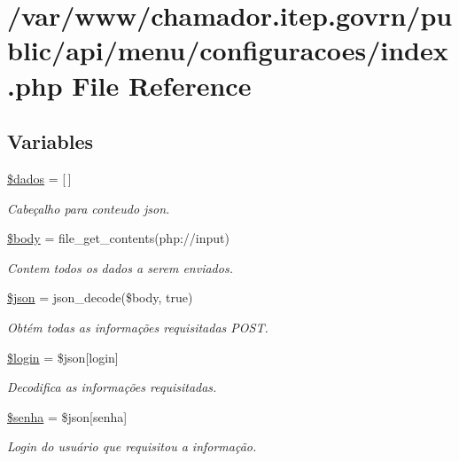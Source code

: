 \hypertarget{menu_2configuracoes_2index_8php}{}\section{/var/www/chamador.itep.\+govrn/public/api/menu/configuracoes/index.php File Reference}
\label{menu_2configuracoes_2index_8php}
\subsection*{Variables}
\begin{DoxyCompactItemize}
\item 
\hyperlink{menu_2configuracoes_2index_8php_a252370d95039a38fa11afab784725d58}{\$dados} = \mbox{[}$\,$\mbox{]}
\begin{DoxyCompactList}\small\item\em Cabeçalho para conteudo json. \end{DoxyCompactList}\item 
\hyperlink{menu_2configuracoes_2index_8php_a26b9f9373f7bb79dfcf8a86dff086b45}{\$body} = file\+\_\+get\+\_\+contents(\textquotesingle{}php\+://input\textquotesingle{})
\begin{DoxyCompactList}\small\item\em Contem todos os dados a serem enviados. \end{DoxyCompactList}\item 
\hyperlink{menu_2configuracoes_2index_8php_acedd13b51401130848ce18f4d5c52605}{\$json} = json\+\_\+decode(\$body, true)
\begin{DoxyCompactList}\small\item\em Obtém todas as informações requisitadas P\+O\+ST. \end{DoxyCompactList}\item 
\hyperlink{menu_2configuracoes_2index_8php_afc31993e855f9631572adfedcfe6f34b}{\$login} = \$json\mbox{[}\textquotesingle{}login\textquotesingle{}\mbox{]}
\begin{DoxyCompactList}\small\item\em Decodifica as informações requisitadas. \end{DoxyCompactList}\item 
\hyperlink{menu_2configuracoes_2index_8php_a3678c8769c9698fd30581c1016c5f475}{\$senha} = \$json\mbox{[}\textquotesingle{}senha\textquotesingle{}\mbox{]}
\begin{DoxyCompactList}\small\item\em Login do usuário que requisitou a informação. \end{DoxyCompactList}\item 

\end{DoxyCompactItemize}
